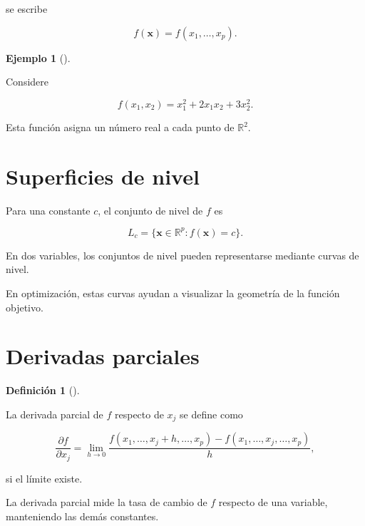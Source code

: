\documentclass[
  spanish,
  10.5pt,
  letterpaper,
  DIV=11,
  numbers=noendperiod,
  oneside,
  open=any]{scrreprt}
\theoremstyle{definition}
\newtheorem{definition}{Definición}[chapter]
\theoremstyle{definition}
\newtheorem{example}{Ejemplo}[chapter]
\theoremstyle{plain}
\theoremstyle{remark}
\begin{document}
se escribe

\[
f(\mathbf{x})
=
f(x_1,\ldots,x_p).
\]

\begin{example}[]\protect\hypertarget{exm-funcion-cuadratica}{}\label{exm-funcion-cuadratica}

Considere

\[
f(x_1,x_2)
=
x_1^2+2x_1x_2+3x_2^2.
\]

Esta función asigna un número real a cada punto de \(\mathbb{R}^{2}\).

\end{example}

\section*{Superficies de nivel}\label{superficies-de-nivel}


Para una constante \(c\), el conjunto de nivel de \(f\) es

\[
L_c
=
\{
\mathbf{x}\in\mathbb{R}^{p}
:
f(\mathbf{x})=c
\}.
\]

En dos variables, los conjuntos de nivel pueden representarse mediante
curvas de nivel.

En optimización, estas curvas ayudan a visualizar la geometría de la
función objetivo.

\section*{Derivadas parciales}\label{derivadas-parciales}


\begin{definition}[]\protect\hypertarget{def-derivada-parcial}{}\label{def-derivada-parcial}

La derivada parcial de \(f\) respecto de \(x_j\) se define como

\[
\frac{\partial f}{\partial x_j}
=
\lim_{h\to 0}
\frac{
f(x_1,\ldots,x_j+h,\ldots,x_p)
-
f(x_1,\ldots,x_j,\ldots,x_p)
}{
h
},
\]

si el límite existe.

\end{definition}

La derivada parcial mide la tasa de cambio de \(f\) respecto de una
variable, manteniendo las demás constantes.
\end{document}
